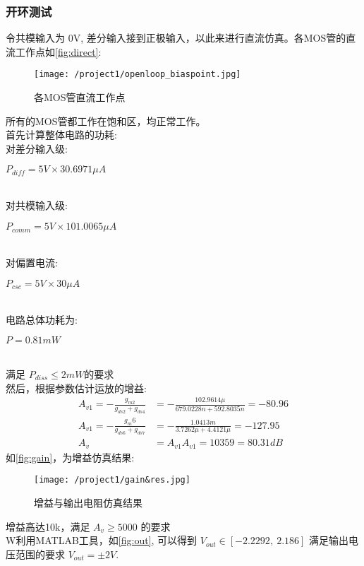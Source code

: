     \subsubsection{开环测试}
    令共模输入为 0V, 差分输入接到正极输入，以此来进行直流仿真。各MOS管的直流工作点如\autoref{fig:direct}: \\
    \begin{figure}[H]
        \centering
        \texttt{[image: /project1/openloop\_biaspoint.jpg]}
        \caption{\label{fig:direct}各MOS管直流工作点}
    \end{figure}
    \indent 所有的MOS管都工作在饱和区，均正常工作。 \\
    \indent 首先计算整体电路的功耗: \\
    \indent 对差分输入级: \\
    \centerline{$ P_{diff} = 5V\times 30.6971\mu A $} \\
    \indent 对共模输入级: \\
    \centerline{$ P_{comm} = 5V\times 101.0065\mu A $} \\
    \indent 对偏置电流: \\
    \centerline{$ P_{csc} = 5V\times 30\mu A $} \\
    \indent 电路总体功耗为: \\
    \centerline{$ P = 0.81mW $} \\
    \indent 满足 $ P_{diss} \leq 2mW $的要求 \\
    \indent 然后，根据参数估计运放的增益: \\
    \begin{align}
        A_{v1} = -\frac{g_{m2}}{g_{ds2}+g_{ds4}} & = -\frac{102.9614\mu}{679.0228n+592.8035n} = -80.96 \\
        A_{v1} = -\frac{g_m6}{g_{ds6}+g_{ds7}} & = -\frac{1.0413m}{3.7262\mu+4.4121\mu} = -127.95 \\
        A_v & = A_{v1}A_{v1} = 10359 = 80.31dB
    \end{align}
    \indent 如\autoref{fig:gain}，为增益仿真结果: 
    \begin{figure}[H]
        \centering
        \texttt{[image: /project1/gain\&res.jpg]}
        \caption{\label{fig:gain}增益与输出电阻仿真结果}
    \end{figure}
    \indent 增益高达10k，满足 $ A_v \geq 5000 $ 的要求 \\
    \indent W利用MATLAB工具，如\autoref{fig:out}, 可以得到 $ V_{out} \in [-2.2292,\ 2.186] $ 
    满足输出电压范围的要求 $ V_{out} = \pm 2V $. \\ 
